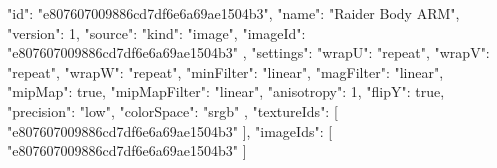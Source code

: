 {
  "id": "e807607009886cd7df6e6a69ae1504b3",
  "name": "Raider Body ARM",
  "version": 1,
  "source": {
    "kind": "image",
    "imageId": "e807607009886cd7df6e6a69ae1504b3"
  },
  "settings": {
    "wrapU": "repeat",
    "wrapV": "repeat",
    "wrapW": "repeat",
    "minFilter": "linear",
    "magFilter": "linear",
    "mipMap": true,
    "mipMapFilter": "linear",
    "anisotropy": 1,
    "flipY": true,
    "precision": "low",
    "colorSpace": "srgb"
  },
  "textureIds": [
    "e807607009886cd7df6e6a69ae1504b3"
  ],
  "imageIds": [
    "e807607009886cd7df6e6a69ae1504b3"
  ]
}
